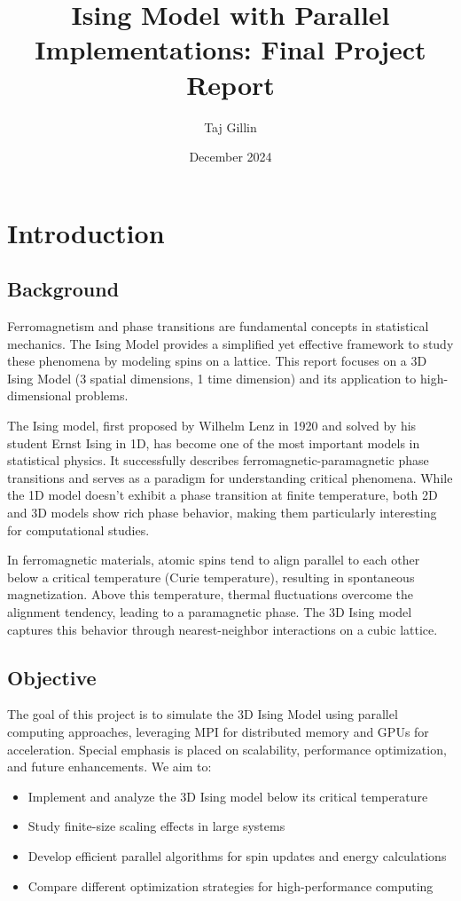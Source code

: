 \documentclass{article}
\title{Ising Model with Parallel Implementations: Final Project Report}
\author{Taj Gillin}
\date{December 2024}
\begin{document}
\maketitle

\tableofcontents
\newpage

\section{Introduction}
\subsection{Background}
Ferromagnetism and phase transitions are fundamental concepts in statistical mechanics. The Ising Model provides a simplified yet effective framework to study these phenomena by modeling spins on a lattice. This report focuses on a 3D Ising Model (3 spatial dimensions, 1 time dimension) and its application to high-dimensional problems.

The Ising model, first proposed by Wilhelm Lenz in 1920 and solved by his student Ernst Ising in 1D, has become one of the most important models in statistical physics. It successfully describes ferromagnetic-paramagnetic phase transitions and serves as a paradigm for understanding critical phenomena. While the 1D model doesn't exhibit a phase transition at finite temperature, both 2D and 3D models show rich phase behavior, making them particularly interesting for computational studies.

In ferromagnetic materials, atomic spins tend to align parallel to each other below a critical temperature (Curie temperature), resulting in spontaneous magnetization. Above this temperature, thermal fluctuations overcome the alignment tendency, leading to a paramagnetic phase. The 3D Ising model captures this behavior through nearest-neighbor interactions on a cubic lattice.

\subsection{Objective}
The goal of this project is to simulate the 3D Ising Model using parallel computing approaches, leveraging MPI for distributed memory and GPUs for acceleration. Special emphasis is placed on scalability, performance optimization, and future enhancements. We aim to:
\begin{itemize}
    \item Implement and analyze the 3D Ising model below its critical temperature
    \item Study finite-size scaling effects in large systems
    \item Develop efficient parallel algorithms for spin updates and energy calculations
    \item Compare different optimization strategies for high-performance computing
\end{itemize}
\end{document}

